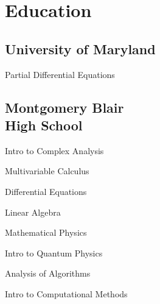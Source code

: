\documentclass[]{deedy-resume-openfont}
\begin{document}

%
%

\begin{minipage}[t]{0.33\textwidth} 

\section{Education} 

\vspace{0.125cm}

\sectionsep
\subsection{University of Maryland}

\vspace{0.375cm}
\begin{tightemize}
    \item Partial Differential Equations
\end{tightemize}
\vspace{0.125cm}

\sectionsep
\subsection{Montgomery Blair \\ High School}

\vspace{0.125cm}
\begin{tightemize}
    \item Intro to Complex Analysis
    \item Multivariable Calculus
    \item Differential Equations
    \item Linear Algebra
    \item Mathematical Physics
    \item Intro to Quantum Physics
    \item Analysis of Algorithms
    \item Intro to Computational Methods
\end{tightemize}
\vspace{0.125cm}


\end{minipage}
\end{document}
